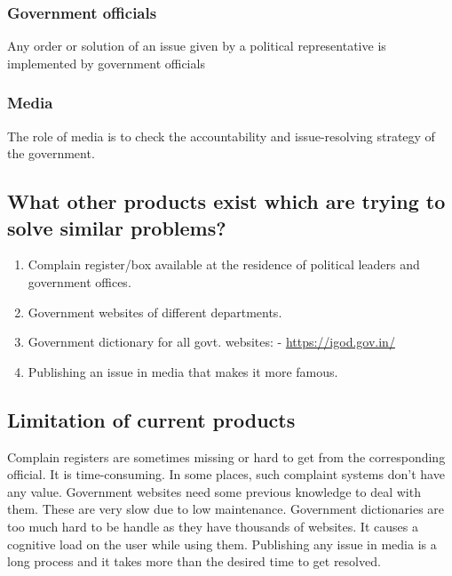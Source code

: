 \documentclass[acmtog]{acmart}
\begin{document}
\subsubsection{Government officials}
Any order or solution of an issue given by a political representative is implemented by government officials
\subsubsection{Media}
The role of media is to check the accountability and issue-resolving strategy of the government.

\subsection{What other products exist which are trying to solve similar problems?}
\begin{enumerate}
    \item Complain register/box available at the residence of political leaders and government offices.
    \item Government websites of different departments.
    \item Government dictionary for all govt. websites: - \url{https://igod.gov.in/}
    \item Publishing an issue in media that makes it more famous. 
\end{enumerate}

\subsection{Limitation of current products}
Complain registers are sometimes missing or hard to get from the corresponding official. It is time-consuming. In some places, such complaint systems don’t have any value.
Government websites need some previous knowledge to deal with them. These are very slow due to low maintenance.
Government dictionaries are too much hard to be handle as they have thousands of websites. It causes a cognitive load on the user while using them.
Publishing any issue in media is a long process and it takes more than the desired time to get resolved.

\end{document}
